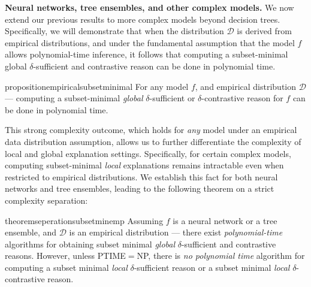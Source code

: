 \documentclass{article}
\newtheorem{theorem}{Theorem}
\begin{document}

\textbf{Neural networks, tree ensembles, and other complex models.} We now extend our previous results to more complex models beyond decision trees. Specifically, we will demonstrate that when the distribution $\mathcal{D}$ is derived from empirical distributions, and under the fundamental assumption that the model $f$ allows polynomial-time inference, it follows that computing a subset-minimal global $\delta$-sufficient and contrastive reason can be done in polynomial time.

\begin{restatable}{proposition}{empiricalsubsetminimal}\label{empirical_subset_minimal_prop}
For any model $f$, and empirical distribution $\mathcal{D}$ --- computing a subset-minimal \emph{global} $\delta$-sufficient or $\delta$-contrastive reason for $f$ can be done in polynomial time. 
\end{restatable}

This strong complexity outcome, which holds for \emph{any} model under an empirical data distribution assumption, allows us to further differentiate the complexity of local and global explanation settings. Specifically, for certain complex models, computing subset-minimal \emph{local} explanations remains intractable even when restricted to empirical distributions. We establish this fact for both neural networks and tree ensembles, leading to the following theorem on a strict complexity separation:


\begin{restatable}{theorem}{seperationsubsetminemp}\label{seperation_subset_min_emp_theor}
    Assuming $f$ is a neural network or a tree ensemble, and $\mathcal{D}$ is an empirical distribution --- there exist \emph{polynomial-time} algorithms for obtaining subset minimal \emph{global} $\delta$-sufficient and contrastive reasons. However, unless PTIME$=$NP, there is \emph{no polynomial time} algorithm for computing a subset minimal \emph{local} $\delta$-sufficient reason or a subset minimal \emph{local} $\delta$-contrastive reason.
\end{restatable}
\end{document}
